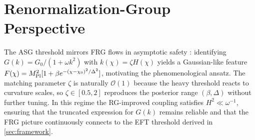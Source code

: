 \documentclass[11pt,a4paper]{article}
\begin{document}
\section{Renormalization-Group Perspective}
\label{sec:rg}
The ASG threshold mirrors FRG flows in asymptotic safety \cite{Saueressig2023}: identifying $G(k)=G_{0}/(1+\omega k^{2})$ with $k(\chi)=\zeta H(\chi)$ yields a Gaussian-like feature $F(\chi)=M_{\rm Pl}^{2}[1+\beta e^{-(\chi-\chi_{0})^{2}/\Delta^{2}}]$, motivating the phenomenological ansatz. The matching parameter $\zeta$ is naturally $\mathcal{O}(1)$ because the heavy threshold reacts to curvature scales, so $\zeta\in[0.5,2]$ reproduces the posterior range $(\beta,\Delta)$ without further tuning. In this regime the RG-improved coupling satisfies $H^{2}\ll \omega^{-1}$, ensuring that the truncated expression for $G(k)$ remains reliable and that the FRG picture continuously connects to the EFT threshold derived in \cref{sec:framework}.
\end{document}
